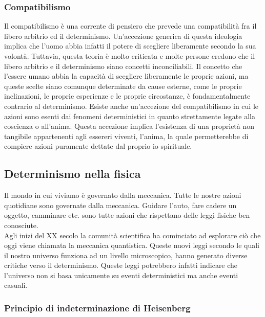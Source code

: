 \documentclass[a4paper, 12pt]{article}
\begin{document}
\subsubsection{Compatibilismo}

Il compatibilismo è una corrente di pensiero che prevede una compatibilità
fra il libero arbitrio ed il determinismo. Un'accezione generica di questa ideologia
implica che l'uomo abbia infatti il potere di scegliere liberamente secondo la sua volontà.
Tuttavia, questa teoria è molto criticata e molte persone credono che
il libero arbitrio e il determinismo siano concetti inconciliabili.
Il concetto che l'essere umano abbia la capacità di scegliere liberamente le proprie azioni,
ma queste scelte siano comunque determinate da cause esterne,
come le proprie inclinazioni, le proprie esperienze e le proprie circostanze,
è fondamentalmente contrario al determinismo.
Esiste anche un'accezione del compatibilismo in cui le azioni sono
esenti dai fenomeni deterministici in quanto strettamente legate alla coscienza o all'anima.
Questa accezione implica l'esistenza di una proprietà non tangibile
appartenenti agli essereri viventi, l'anima, la quale permetterebbe di compiere
azioni puramente dettate dal proprio io spirituale.

\subsection{Determinismo nella fisica}

Il mondo in cui viviamo è governato dalla meccanica.
Tutte le nostre azioni quotidiane sono governate dalla meccanica.
Guidare l'auto, fare cadere un oggetto, camminare etc. sono tutte azioni
che rispettano delle leggi fisiche ben conosciute. \\
Agli inizi del XX secolo la comunità scientifica ha cominciato ad esplorare ciò che
oggi viene chiamata la meccanica quantistica. Queste nuovi leggi secondo le quali il nostro universo funziona
ad un livello microscopico, hanno generato diverse critiche verso il determinismo.
Queste leggi potrebbero infatti indicare che l'universo non si basa unicamente su eventi deterministici ma anche eventi casuali.

\subsubsection{Principio di indeterminazione di Heisenberg}
\end{document}
